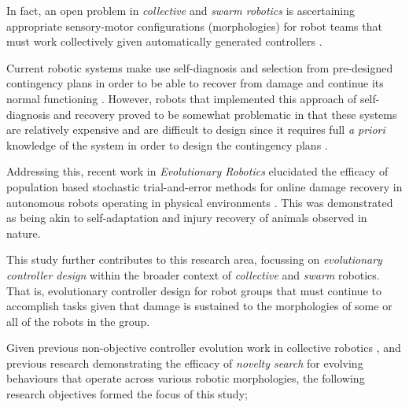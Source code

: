 {In fact, an open problem in \textit{collective} \cite{KubeZhang1994B} and \textit{swarm robotics} \cite{Beni2004}
is ascertaining appropriate sensory-motor configurations (morphologies) for robot teams that must work collectively given automatically generated controllers \cite{FloreanoDurrMattiussi2008}.

Current robotic systems make use self-diagnosis and selection from pre-designed contingency plans in order to be able to recover from damage and continue its normal functioning \cite{fenton2001fault, verma2004real, BongardZykovLipson2006}. However, robots that implemented this approach of self-diagnosis and recovery proved to be somewhat problematic in that these systems are relatively expensive and are difficult to design since it requires full \textit{a priori} knowledge of the system in order to design the contingency plans \cite{CullyCluneTaraporeMouret2015}.





Addressing this, recent work in \textit{Evolutionary Robotics} elucidated the efficacy of population based stochastic trial-and-error methods for online damage recovery in autonomous robots operating in physical environments \cite{CullyCluneTaraporeMouret2015}.
This was demonstrated as being akin to self-adaptation and injury recovery of animals observed in nature.

This study further contributes to this research area, focussing on \textit{evolutionary controller design} \cite{FloreanoDurrMattiussi2008} within the broader context of \textit{collective} \cite{KubeZhang1994B} and \textit{swarm} \cite{Beni2004} robotics.
That is, evolutionary controller design for robot groups that must continue to accomplish tasks given that damage is sustained to the morphologies of some or all of the robots in the group.



Given previous non-objective controller evolution work in collective robotics
\cite{gomes2013generic}
\cite{RefWorks:5}
\cite{RefWorks:11},
and previous research demonstrating the efficacy of \textit{novelty search} \cite{lehman2011abandoning} for evolving behaviours that operate across various robotic morphologies, the following research objectives formed the focus of this study;

}
